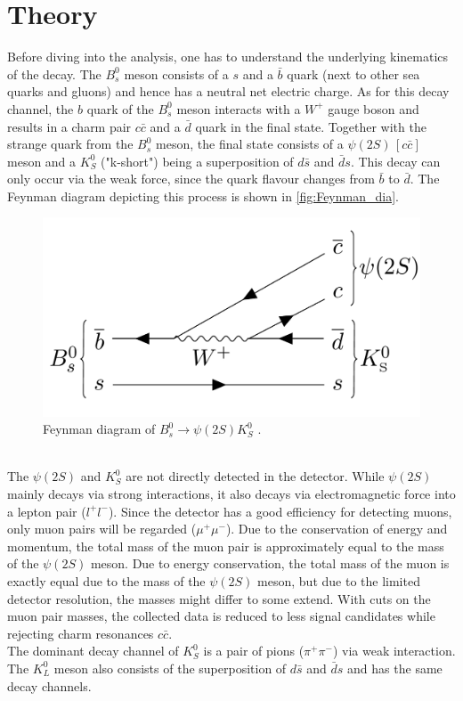 \section{Theory}
\label{sec:Theorie}

Before diving into the analysis, one has to understand the underlying kinematics of the decay. The $B_s^0$ meson consists of a $s$ and a $\bar{b}$ quark (next to other sea quarks and gluons) and hence
has a neutral net electric charge. As for this decay channel, the $b$ quark of the $B_s^0$ meson interacts with a $W^+$ gauge boson and results in a charm pair $c \bar{c}$ and a $\bar{d}$ quark in the 
final state. Together with the strange quark from the $B_s^0$ meson, the final state consists of a $\psi (2S) \, [c \bar{c}]$ meson and a $K_S^0$ ("k-short") being a superposition of $d\bar{s}$ and $\bar{d}s$.
This decay can only occur via the weak force, since the quark flavour changes from $\bar{b}$ to $\bar{d}$. The Feynman diagram depicting this process is shown in \autoref{fig:Feynman_dia}.
\begin{figure}
    \centering
    \includegraphics[width = .5\textwidth]{"content/pics/Feynman.png"}
    \caption{Feynman diagram of $B_s^0 \to \psi (2S)K_S^0$ \cite{LHCb_MVA}.}
    \label{fig:Feynman_dia}
  \end{figure}
\\The $\psi (2S)$ and $K_S^0$ are not directly detected in the detector. While $\psi (2S)$ mainly decays via strong interactions, it also decays via
electromagnetic force into a lepton pair ($l^+l^-$).
Since the detector has a good efficiency for detecting muons, only muon pairs will be regarded ($\mu^+\mu^-$). Due to the conservation of energy and momentum, the 
total mass of the muon pair is approximately equal to the mass of the $\psi (2S)$ meson. Due to energy conservation, the total mass of the muon is exactly equal due to the 
mass of the $\psi (2S)$ meson, but due to the limited detector resolution, the masses might differ to some extend. With cuts on the muon pair masses, the collected data is reduced to less signal candidates while
rejecting charm resonances $c\bar{c}$.\\
The dominant decay channel of $K_S^0$ is a pair of pions ($\pi^+\pi^-$) via weak interaction. The $K_L^0$ meson also consists of the superposition of $d\bar{s}$ and $\bar{d}s$ and has the same decay channels.
